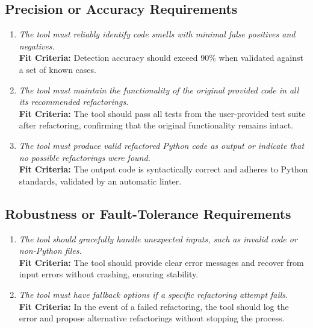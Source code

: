\documentclass[12pt]{article}
\begin{document}
\subsection{Precision or Accuracy Requirements}
\begin{enumerate}[label=PR-PRA \arabic*., wide=0pt, leftmargin=*]
  \item \emph{The tool must reliably identify code smells with minimal false positives and negatives.}\\
  {\bf Fit Criteria:} Detection accuracy should exceed 90\% when validated against a set of known cases.
  
  \item \emph{The tool must maintain the functionality of the original provided code in all its recommended refactorings.}\\
  {\bf Fit Criteria:} The tool should pass all tests from the user-provided test suite after refactoring, confirming that the original functionality remains intact.
  
  \item \emph{The tool must produce valid refactored Python code as output or indicate that no possible refactorings were found.}\\
  {\bf Fit Criteria:} The output code is syntactically correct and adheres to Python standards, validated by an automatic linter.
\end{enumerate}

\subsection{Robustness or Fault-Tolerance Requirements}
\begin{enumerate}[label=PR-RFT \arabic*., wide=0pt, leftmargin=*]
  \item \emph{The tool should gracefully handle unexpected inputs, such as invalid code or non-Python files.}\\
  {\bf Fit Criteria:} The tool should provide clear error messages and recover from input errors without crashing, ensuring stability.
  
  \item \emph{The tool must have fallback options if a specific refactoring attempt fails.}\\
  {\bf Fit Criteria:} In the event of a failed refactoring, the tool should log the error and propose alternative refactorings without stopping the process.
\end{enumerate}
\end{document}
